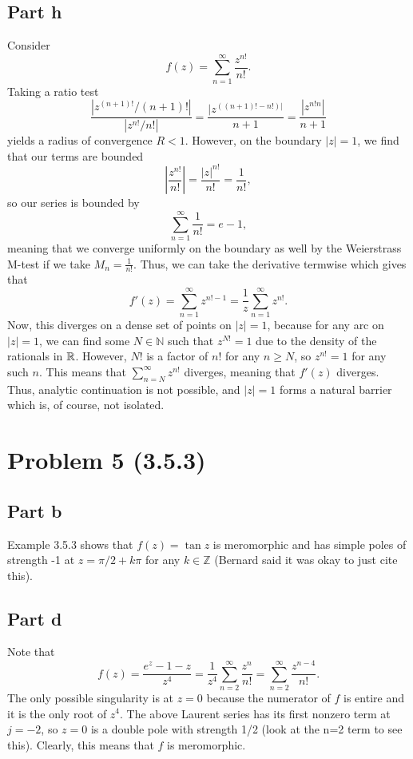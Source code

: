 \documentclass{article}
\begin{document}
\subsection{Part h}
Consider 
\[
f(z)=\sum\limits_{n=1}^\infty \frac{z^{n!}}{n!}. 
\]
Taking a ratio test
\[
\frac{|z^{(n+1)!}/(n+1)!|}{|z^{n!}/n!|}=\frac{|z^{((n+1)!-n!)|}}{n+1}=\frac{|z^{n!n}|}{n+1}
\]
yields a radius of convergence $R<1$. However, on the boundary $|z|=1$, we find that our terms are bounded
\[
\left|\frac{z^{n!}}{n!}\right|=\frac{|z|^{n!}}{n!}=\frac{1}{n!},
\]
so our series is bounded by 
\[
\sum\limits_{n=1}^\infty\frac{1}{n!}=e-1,
\]
meaning that we converge uniformly on the boundary as well by the Weierstrass M-test if we take $M_n=\frac{1}{n!}$. Thus, we can take the derivative termwise which gives that 
\[
f'(z)=\sum\limits_{n=1}^\infty z^{n!-1}=\frac{1}{z}\sum\limits_{n=1}^\infty z^{n!}.
\]
Now, this diverges on a dense set of points on $|z|=1$, because for any arc on $|z|=1$, we can find some $N\in\mathbb{N}$ such that $z^{N!}=1$ due to the density of the rationals in $\mathbb{R}$. However, $N!$ is a factor of $n!$ for any $n\geq N$, so $z^{n!}=1$  for any such $n$. This means that $\sum\limits_{n=N}^\infty z^{n!}$ diverges, meaning that $f'(z)$ diverges. Thus, analytic continuation is not possible, and $|z|=1$ forms a natural barrier which is, of course, not isolated. 


\section{Problem 5 (3.5.3)}
\subsection{Part b}
Example 3.5.3 shows that $f(z)=\tan z$ is meromorphic and has simple poles of strength -1 at $z=\pi/2+k\pi$ for any $k\in\mathbb{Z}$ (Bernard said it was okay to just cite this).

\subsection{Part d}
Note that 
\[
f(z)=\frac{e^z-1-z}{z^4}=\frac{1}{z^4}\sum_{n=2}^\infty \frac{z^n}{n!}=\sum_{n=2}^\infty \frac{z^{n-4}}{n!}.
\]
The only possible singularity is at $z=0$ because the numerator of $f$ is entire and it is the only root of $z^4$. The above Laurent series has its first nonzero term at $j=-2$, so $z=0$ is a double pole with strength 1/2 (look at the n=2 term to see this). Clearly, this means that $f$ is meromorphic.
\end{document}
